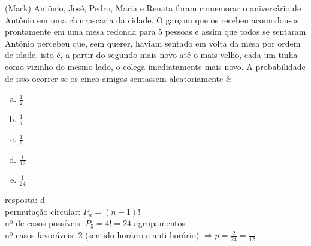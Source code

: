 \begin{ex}
  (Mack) Antônio, José, Pedro, Maria e Renata foram comemorar o aniversário de Antônio em uma churrascaria da cidade. O garçom que os recebeu acomodou-os prontamente em uma mesa redonda para 5 pessoas e assim que todos se sentaram Antônio percebeu que, sem querer, haviam sentado em volta da mesa por ordem de idade, isto é, a partir do segundo mais novo até o mais velho, cada um tinha como vizinho do mesmo lado, o colega imediatamente mais novo. A probabilidade de isso ocorrer se os cinco amigos sentassem aleatoriamente é:
    \begin{enumerate}  [(a)]
        \item $\frac{1}{2}$
        \item $\frac{1}{4}$
        \item $\frac{1}{6}$
        \item $\frac{1}{12}$
        \item $\frac{1}{24}$
    \end{enumerate}
      \begin{sol}
       resposta: d \\
       permutação circular: $P_n=(n-1)!$ \\
       nº de casos possíveis: $P_5=4!= 24$ agrupamentos \\
       nº casos favoráveis: 2 (sentido horário e anti-horário) 
       $\Longrightarrow  p=\frac{2}{24}=\frac{1}{12}$
      \end{sol}
 \end{ex}